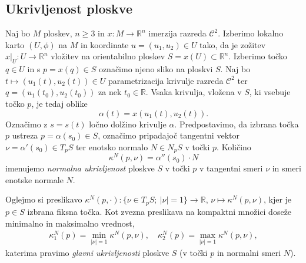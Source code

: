 \documentclass[12pt,a4paper,twoside]{article}
\theoremstyle{definition} %
\theoremstyle{plain} %
\numberwithin{equation}{section}  %
\newcommand{\R}{\mathbb R}
\begin{document}
\subsection{Ukrivljenost ploskve}
%
Naj bo $M$ ploskev, $n \geq 3$ in $x \colon M \to \R^{n}$ imerzija razreda $\mathcal{C}^2$. Izberimo lokalno karto $(U, \phi)$ na $M$ in koordinate $u = (u_1, u_2) \in U$ tako, da je zožitev $x|_{U} \colon U \to \R^{n}$ vložitev na orientabilno ploskev $S = x(U) \subset \R^{n}$. Izberimo točko $q \in U$ in s $p = x(q) \in S$ označimo njeno sliko na ploskvi $S$. Naj bo $t \mapsto (u_1(t), u_2(t)) \in U$ parametrizacija krivulje razreda $\mathcal{C}^2$ ter $q = (u_1(t_0), u_2(t_0))$ za nek $t_0 \in \mathbb{R}$. Vsaka krivulja, vložena v $S$, ki vsebuje točko $p$, je tedaj oblike
\begin{equation}
\alpha (t) = x(u_1(t), u_2(t)).
\end{equation}
Označimo z $s = s(t)$ ločno dolžino krivulje $\alpha$. Predpostavimo, da izbrana točka $p$ ustreza $p = \alpha(s_0) \in S$, označimo pripadajoč tangentni vektor $\nu = \alpha '(s_0) \in T_{p}S$ ter enotsko normalo $N \in N_{p}S$ v točki $p$. Količino
\begin{equation}
\kappa ^{N}(p, \nu) = \alpha ''(s_0) \cdot N
\end{equation}
imenujemo \emph{normalna ukrivljenost} ploskve $S$ v točki $p$ v tangentni smeri $\nu$ in smeri enotske normale $N$.

Oglejmo si preslikavo $ \kappa ^{N}(p, \cdot) \colon \{\nu \in T_{p}S ; \ |\nu|=1 \} \to \R$, $ \nu \mapsto \kappa ^{N}(p, \nu)$, kjer je $p \in S$ izbrana fiksna točka. Kot zvezna preslikava na kompaktni množici doseže minimalno in maksimalno vrednost,
\begin{gather} 
\kappa _{1}^{N}(p) = \min _{|\nu| = 1} \kappa ^{N}(p, \nu), \quad \kappa _{2}^{N}(p) = \max _{|\nu| = 1} \kappa ^{N}(p, \nu),
\end{gather}
katerima pravimo \emph{glavni ukrivljenosti} ploskve $S$ (v točki $p$ in normalni smeri $N$).
\end{document}

